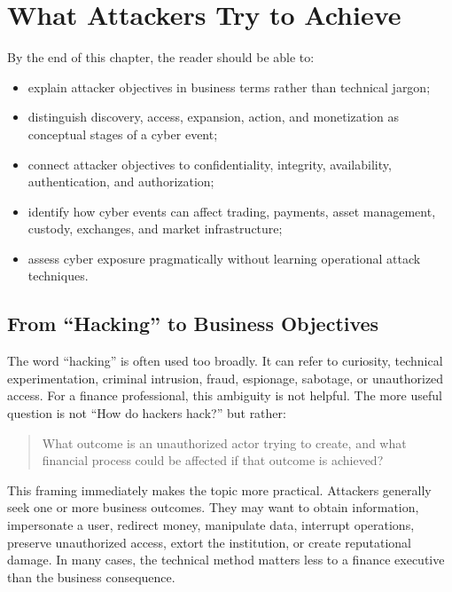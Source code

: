 \chapter{What Attackers Try to Achieve}

\begin{learningobjectives}
By the end of this chapter, the reader should be able to:
\begin{itemize}
    \item explain attacker objectives in business terms rather than technical jargon;
    \item distinguish discovery, access, expansion, action, and monetization as conceptual stages of a cyber event;
    \item connect attacker objectives to confidentiality, integrity, availability, authentication, and authorization;
    \item identify how cyber events can affect trading, payments, asset management, custody, exchanges, and market infrastructure;
    \item assess cyber exposure pragmatically without learning operational attack techniques.
\end{itemize}
\end{learningobjectives}

\section{From ``Hacking'' to Business Objectives}

The word ``hacking'' is often used too broadly. It can refer to curiosity, technical experimentation, criminal intrusion, fraud, espionage, sabotage, or unauthorized access. For a finance professional, this ambiguity is not helpful. The more useful question is not ``How do hackers hack?'' but rather:

\begin{quote}
What outcome is an unauthorized actor trying to create, and what financial process could be affected if that outcome is achieved?
\end{quote}

This framing immediately makes the topic more practical. Attackers generally seek one or more business outcomes. They may want to obtain information, impersonate a user, redirect money, manipulate data, interrupt operations, preserve unauthorized access, extort the institution, or create reputational damage. In many cases, the technical method matters less to a finance executive than the business consequence.

